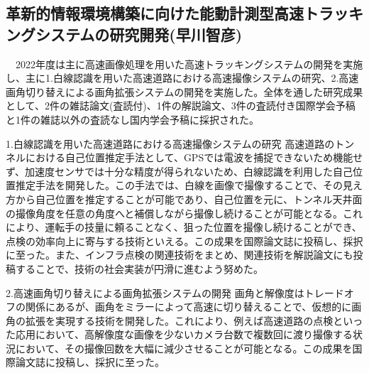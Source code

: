 \subsection{革新的情報環境構築に向けた能動計測型高速トラッキングシステムの研究開発(早川智彦)}

　2022年度は主に高速画像処理を用いた高速トラッキングシステムの開発を実施し、主に1.白線認識を用いた高速道路における高速撮像システムの研究、2.高速画角切り替えによる画角拡張システムの開発を実施した。全体を通した研究成果として、2件の雑誌論文(査読付)、1件の解説論文、3件の査読付き国際学会予稿と1件の雑誌以外の査読なし国内学会予稿に採択された。

1.白線認識を用いた高速道路における高速撮像システムの研究
高速道路のトンネルにおける自己位置推定手法として、GPSでは電波を捕捉できないため機能せず、加速度センサでは十分な精度が得られないため、白線認識を利用した自己位置推定手法を開発した。この手法では、白線を画像で撮像することで、その見え方から自己位置を推定することが可能であり、自己位置を元に、トンネル天井面の撮像角度を任意の角度へと補償しながら撮像し続けることが可能となる。これにより、運転手の技量に頼ることなく、狙った位置を撮像し続けることができ、点検の効率向上に寄与する技術といえる。この成果を国際論文誌に投稿し、採択に至った。また、インフラ点検の関連技術をまとめ、関連技術を解説論文にも投稿することで、技術の社会実装が円滑に進むよう努めた。

2.高速画角切り替えによる画角拡張システムの開発
画角と解像度はトレードオフの関係にあるが、画角をミラーによって高速に切り替えることで、仮想的に画角の拡張を実現する技術を開発した。これにより、例えば高速道路の点検といった応用において、高解像度な画像を少ないカメラ台数で複数回に渡り撮像する状況において、その撮像回数を大幅に減少させることが可能となる。この成果を国際論文誌に投稿し、採択に至った。
